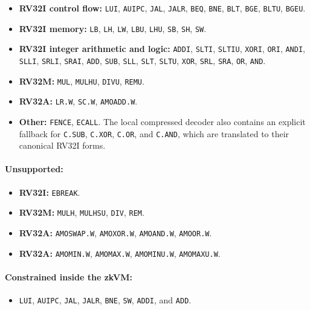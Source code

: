\begin{itemize}
	\item \textbf{RV32I control flow:} \texttt{LUI}, \texttt{AUIPC}, \texttt{JAL}, \texttt{JALR}, \texttt{BEQ}, \texttt{BNE}, \texttt{BLT}, \texttt{BGE}, \texttt{BLTU}, \texttt{BGEU}.
	\item \textbf{RV32I memory:} \texttt{LB}, \texttt{LH}, \texttt{LW}, \texttt{LBU}, \texttt{LHU}, \texttt{SB}, \texttt{SH}, \texttt{SW}.
	\item \textbf{RV32I integer arithmetic and logic:} \texttt{ADDI}, \texttt{SLTI}, \texttt{SLTIU}, \texttt{XORI}, \texttt{ORI}, \texttt{ANDI}, \texttt{SLLI}, \texttt{SRLI}, \texttt{SRAI}, \texttt{ADD}, \texttt{SUB}, \texttt{SLL}, \texttt{SLT}, \texttt{SLTU}, \texttt{XOR}, \texttt{SRL}, \texttt{SRA}, \texttt{OR}, \texttt{AND}.
	\item \textbf{RV32M:} \texttt{MUL}, \texttt{MULHU}, \texttt{DIVU}, \texttt{REMU}.
	\item \textbf{RV32A:} \texttt{LR.W}, \texttt{SC.W}, \texttt{AMOADD.W}.
	\item \textbf{Other:} \texttt{FENCE}, \texttt{ECALL}. The local compressed decoder also contains an explicit fallback for \texttt{C.SUB}, \texttt{C.XOR}, \texttt{C.OR}, and \texttt{C.AND}, which are translated to their canonical RV32I forms.
\end{itemize}

\paragraph{Unsupported:}

\begin{itemize}
	\item \textbf{RV32I:} \texttt{EBREAK}.
	\item \textbf{RV32M:} \texttt{MULH}, \texttt{MULHSU}, \texttt{DIV}, \texttt{REM}.
	\item \textbf{RV32A:} \texttt{AMOSWAP.W}, \texttt{AMOXOR.W}, \texttt{AMOAND.W}, \texttt{AMOOR.W}.
	\item \textbf{RV32A:} \texttt{AMOMIN.W}, \texttt{AMOMAX.W}, \texttt{AMOMINU.W}, \texttt{AMOMAXU.W}.
\end{itemize}

\paragraph{Constrained inside the zkVM:}

\begin{itemize}
	\item \texttt{LUI}, \texttt{AUIPC}, \texttt{JAL}, \texttt{JALR}, \texttt{BNE}, \texttt{SW}, \texttt{ADDI}, and \texttt{ADD}.
\end{itemize}

